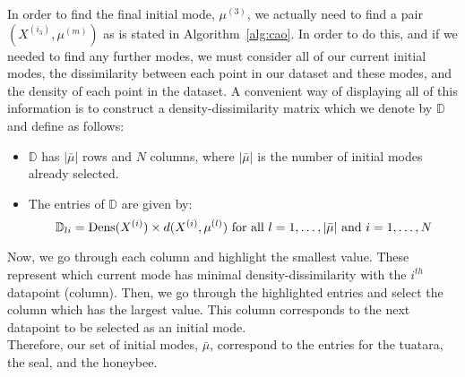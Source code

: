 \begin{example}
    In order to find the final initial mode, \(\mu^{(3)}\), we actually need to
    find a pair \((X^{(i_3)}, \mu^{(m)})\) as is stated in 
    Algorithm~\ref{alg:cao}. In order to do this, and if we needed to find any
    further modes, we must consider all of our current initial modes, the 
    dissimilarity between each point in our dataset and these modes, and the 
    density of each point in the dataset. A convenient way of displaying all of
    this information is to construct a density-dissimilarity matrix which we 
    denote by \(\mathbb{D}\) and define as follows:
    \begin{itemize}
        \item \(\mathbb{D}\) has \(|\bar{\mu}|\) rows and \(N\) columns, where
            \(|\bar{\mu}|\) is the number of initial modes already selected.
        \item The entries of \(\mathbb{D}\) are given by:
            \[
                \mathbb{D}_{li} = \text{Dens}(X^{(i)}) \times d(X^{(i)},
                \mu^{(l)}) \ \text{for all} \ l = 1, \ldots, |\bar{\mu}| \
                \text{and} \ i = 1, \ldots, N \\
            \]
    \end{itemize}

    Now, we go through each column and highlight the smallest value. These
    represent which current mode has minimal density-dissimilarity with the
    \(i^{th}\) datapoint (column). Then, we go through the highlighted entries
    and select the column which has the largest value. This column corresponds
    to the next datapoint to be selected as an initial mode.\\

    Therefore, our set of initial modes, \(\bar{\mu}\), correspond to the
    entries for the tuatara, the seal, and the honeybee.
\end{example}

